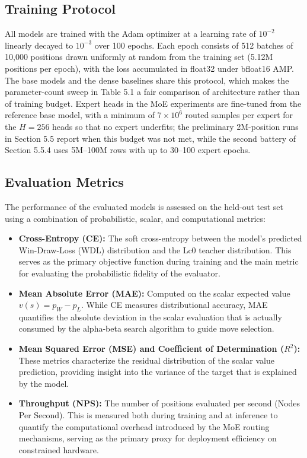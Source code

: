 \subsection{Training Protocol}

All models are trained with the Adam optimizer at a learning rate of $10^{-2}$ linearly decayed to $10^{-3}$ over 100 epochs. Each epoch consists of 512 batches of 10,000 positions drawn uniformly at random from the training set (5.12M positions per epoch), with the loss accumulated in float32 under bfloat16 AMP. The base models and the dense baselines share this protocol, which makes the parameter-count sweep in Table 5.1 a fair comparison of architecture rather than of training budget. Expert heads in the MoE experiments are fine-tuned from the reference base model, with a minimum of $7\times10^6$ routed samples per expert for the $H{=}256$ heads so that no expert underfits; the preliminary 2M-position runs in Section 5.5 report when this budget was not met, while the second battery of Section 5.5.4 uses 5M--100M rows with up to 30--100 expert epochs.

\subsection{Evaluation Metrics}

The performance of the evaluated models is assessed on the held-out test set using a combination of probabilistic, scalar, and computational metrics:

\begin{itemize}
	\item \textbf{Cross-Entropy (CE):} The soft cross-entropy between the model's predicted Win-Draw-Loss (WDL) distribution and the Lc0 teacher distribution. This serves as the primary objective function during training and the main metric for evaluating the probabilistic fidelity of the evaluator.
	
	\item \textbf{Mean Absolute Error (MAE):} Computed on the scalar expected value $v(s) = p_W - p_L$. While CE measures distributional accuracy, MAE quantifies the absolute deviation in the scalar evaluation that is actually consumed by the alpha-beta search algorithm to guide move selection.
	
	\item \textbf{Mean Squared Error (MSE) and Coefficient of Determination ($R^2$):} These metrics characterize the residual distribution of the scalar value prediction, providing insight into the variance of the target that is explained by the model.
	
	\item \textbf{Throughput (NPS):} The number of positions evaluated per second (Nodes Per Second). This is measured both during training and at inference to quantify the computational overhead introduced by the MoE routing mechanisms, serving as the primary proxy for deployment efficiency on constrained hardware.
\end{itemize}

